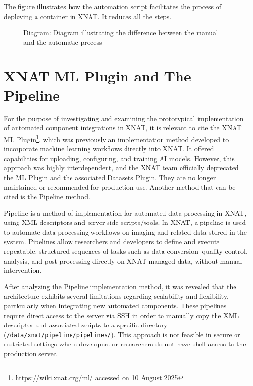 The figure illustrates how the automation script facilitates the process of deploying a container in XNAT. It reduces all the steps.

\begin{figure}[ht]
    \centering
    \def\svgwidth{0.9\linewidth}
    
    \caption{Diagram: Diagram illustrating the difference between the manual and the automatic process}
    \label{fig:enter-label}
\end{figure}

\begin{comment}
    https://wiki.xnat.org/documentation/strategies-for-xnat-image-data-storage
\end{comment}

\section{XNAT ML Plugin and The Pipeline}

For the purpose of investigating and examining the prototypical implementation of automated component integrations in XNAT, it is relevant to cite the XNAT ML Plugin\footnote{\url{https://wiki.xnat.org/ml/} accessed on 10 August 2025}, which was previously an implementation method developed to incorporate machine learning workflows directly into XNAT. It offered capabilities for uploading, configuring, and training AI models. However, this approach was highly interdependent, and the XNAT team officially deprecated the ML Plugin and the associated Datasets Plugin. They are no longer maintained or recommended for production use. Another method that can be cited is the Pipeline method.

Pipeline is a method of implementation for automated data processing in XNAT, using \ac{XML} descriptors and server-side scripts/tools. In XNAT, a pipeline is used to automate data processing workflows on imaging and related data stored in the system. Pipelines allow researchers and developers to define and execute repeatable, structured sequences of tasks such as data conversion, quality control, analysis, and post-processing directly on XNAT-managed data, without manual intervention.

After analyzing the Pipeline implementation method, it was revealed that the architecture exhibits several limitations regarding scalability and flexibility, particularly when integrating new automated components. These pipelines require direct access to the server via SSH in order to manually copy the XML descriptor and associated scripts to a specific directory (\texttt{/data/xnat/pipeline/pipelines/}). This approach is not feasible in secure or restricted settings where developers or researchers do not have shell access to the production server.

